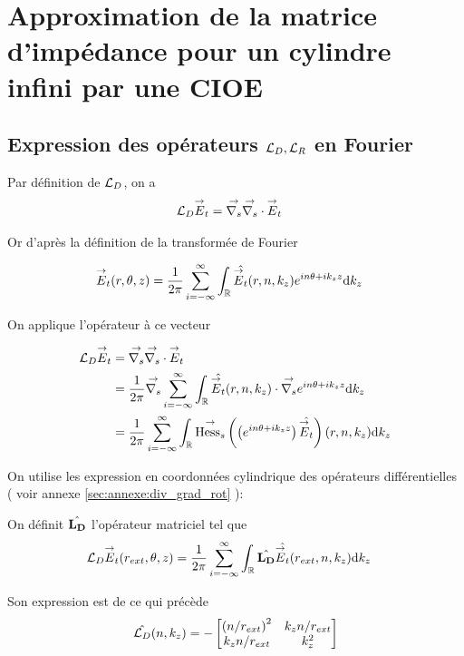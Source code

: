 \section{Approximation de la matrice d'impédance pour un cylindre infini par une CIOE}

  \subsection[Expression des opérateurs LD,LR en Fourier]{Expression des opérateurs \({\mathcal{L}_D},{\mathcal{L}_R}\) en Fourier}

    Par définition de \({\mathcal{L}_D}\), on a
    \begin{align}
      {\mathcal{L}_D} {\overset{\rightarrow}{E}}_t & = {\overset{\rightarrow}{\nabla_s}}{} {\overset{\rightarrow}{\nabla_s}} \cdot{} {\overset{\rightarrow}{E}}_t
    \end{align}

    Or d’après la définition de la transformée de Fourier

    \begin{align}
      {\overset{\rightarrow}{E}}_t(r,\theta,z) & = \dfrac{1}{2\pi}\sum_{i=-\infty}^\infty \int_\mathbb R \hat{{\overset{\rightarrow}{E}}_t}(r,n,k_z)e^{in\theta + ik_zz}\mathrm{d}{k_z}
    \end{align}

    On applique l'opérateur à ce vecteur

    \begin{align}
      {\mathcal{L}_D} {\overset{\rightarrow}{E}}_t
      & = {\overset{\rightarrow}{\nabla_s}}{} {\overset{\rightarrow}{\nabla_s}} \cdot{} {\overset{\rightarrow}{E}}_t
      \\
      &=\dfrac{1}{2\pi}{\overset{\rightarrow}{\nabla_s}}{} \sum_{i=-\infty}^\infty\int_\mathbb R \hat{{\overset{\rightarrow}{E}}_t}(r,n,k_z) \cdot {\overset{\rightarrow}{\nabla_s}}{} e^{in\theta + ik_zz}\mathrm{d}{k_z}
      \\
      &=\dfrac{1}{2\pi}\sum_{i=-\infty}^\infty \int_\mathbb R {\overset{\rightarrow}{\operatorname{Hess}_s}}{}\left(\left( e^{in\theta + ik_zz} \right) \hat{{\overset{\rightarrow}{E}}_t}\right)(r,n,k_z)\mathrm{d}{k_z}
    \end{align}

    On utilise les expression en coordonnées cylindrique des opérateurs différentielles ( voir annexe \ref{sec:annexe:div_grad_rot} ):

    On définit \(\hat{\mathbf{L_D}}\) l'opérateur matriciel tel que
    \begin{align}
      {\mathcal{L}_D} {\overset{\rightarrow}{E}}_t (r_{ext},\theta,z)
      &= \dfrac{1}{2\pi}\sum_{i=-\infty}^\infty\int_\mathbb R \hat{\mathbf{L_D}} \hat{{\overset{\rightarrow}{E}}_t}(r_{ext},n,k_z)\mathrm{d}{k_z}
    \end{align}

    Son expression est de ce qui précède
    \begin{equation}
      \label{eq:cylindre:fourier:LD}
      \hat{{\mathcal{L}_D}}(n,k_z) = -
      \begin{bmatrix}
        \left({n}\slash{r_{ext}}\right)^2 & k_z{n}\slash{r_{ext}}
        \\
        k_z{n}\slash{r_{ext}} & k_z^2
      \end{bmatrix}
    \end{equation}

